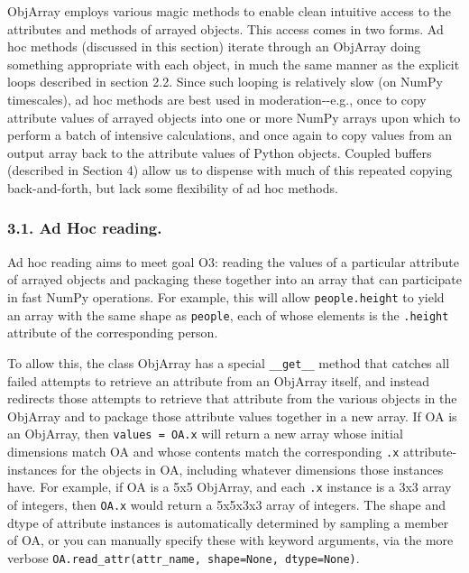 \documentclass[letterpaper,compsoc,twoside]{IEEEtran}
\begin{document}
ObjArray employs various \textquotedbl{}magic methods\textquotedbl{} to enable clean intuitive access to the attributes and methods of arrayed objects.  This access comes in two forms.  Ad hoc methods (discussed in this section) iterate through an ObjArray doing something appropriate with each object, in much the same manner as the explicit loops described in section 2.2.  Since such looping is relatively slow (on NumPy timescales), ad hoc methods are best used in moderation-{}-e.g., once to copy attribute values of arrayed objects into one or more NumPy arrays upon which to perform a batch of intensive calculations, and once again to copy values from an output array back to the attribute values of Python objects.  Coupled buffers (described in Section 4) allow us to dispense with much of this repeated copying back-and-forth, but lack some flexibility of ad hoc methods.

\subsubsection{3.1. Ad Hoc reading.%
  \label{ad-hoc-reading}%
}


Ad hoc reading aims to meet goal O3: reading the values of a particular attribute of arrayed objects and packaging these together into an array that can participate in fast NumPy operations.  For example, this will allow \texttt{people.height} to yield an array with the same shape as \texttt{people}, each of whose elements is the \texttt{.height} attribute of the corresponding person.

To allow this, the class ObjArray has a special \texttt{\_\_get\_\_} method that catches all failed attempts to retrieve an attribute from an ObjArray itself, and instead redirects those attempts to retrieve that attribute from the various objects in the ObjArray and to package those attribute values together in a new array.  If OA is an ObjArray, then \texttt{values = OA.x} will return a new array whose initial dimensions match OA and whose contents match the corresponding \texttt{.x} attribute-instances for the objects in OA, including whatever dimensions those instances have.  For example, if OA is a 5x5 ObjArray, and each \texttt{.x} instance is a 3x3 array of integers, then \texttt{OA.x} would return a 5x5x3x3 array of integers.   The shape and dtype of attribute instances is automatically determined by sampling a member of OA, or you can manually specify these with keyword arguments, via the more verbose \texttt{OA.read\_attr(attr\_name, shape=None, dtype=None)}.
\end{document}
